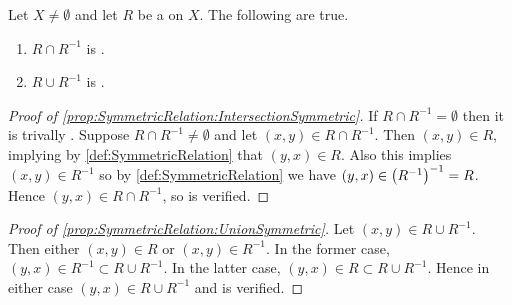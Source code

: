 \begin{prop}
    \label{prop:SymmetricRelation}
\rm
    Let $X \neq \emptyset$ 
    and let $R$ be a \Relation on $X$. 
    The following are true. 
    \begin{enumerate}[label=(\roman*), ref={\ref{prop:SymmetricRelation}~\roman*}]
    \item 
	\label{prop:SymmetricRelation:IntersectionSymmetric} 
	$R \cap R^{-1}$ is \SymmetricRelation.
    \item 
	\label{prop:SymmetricRelation:UnionSymmetric}
	$R \cup R^{-1}$ is \SymmetricRelation.
    \end{enumerate}
    \begin{proof}[Proof of \ref{prop:SymmetricRelation:IntersectionSymmetric}]
    If $R \cap R^{-1} = \emptyset$ 
	then it is trivally \SymmetricRelation.
    Suppose $R \cap R^{-1} \neq \emptyset$ and 
	let $(x,y) \in R \cap R^{-1}$. 
    Then $(x,y) \in R$, 
	implying by \ref{def:SymmetricRelation} that $(y,x) \in R$. 
    Also this implies $(x,y) \in R^{-1}$ so 
	by \ref{def:SymmetricRelation} we have 
    $(y,x) \in \left( R^{-1}\right)^{-1}=R$. 
	Hence $(y,x) \in R \cap R^{-1}$, so \RelationSymmetry is 
    verified.
    \end{proof}
    \begin{proof}[Proof of \ref{prop:SymmetricRelation:UnionSymmetric}]
    Let $(x,y) \in R \cup R^{-1}$. Then either $(x,y) \in R$ 
    or $(x,y) \in R^{-1}$. 
    In the former case, 
	$(y,x) \in R^{-1} \subset R \cup R^{-1}$. 
    In the latter case, 
	$(y,x) \in R \subset R \cup R^{-1}$. 
    Hence in either case 
	$(y, x) \in R \cup R^{-1}$ and 
	\RelationSymmetry is verified.
    \end{proof}
\end{prop}
